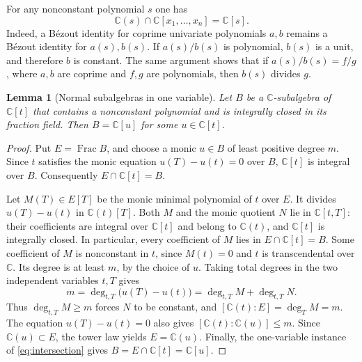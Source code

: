 \documentclass[11pt,reqno]{amsart}
\numberwithin{equation}{section}
\theoremstyle{plain}
\newtheorem{lemma}[theorem]{Lemma}
\theoremstyle{definition}
\theoremstyle{remark}
\newcommand{\C}{\mathbb C}
\newcommand{\Frac}{\operatorname{Frac}}
\begin{document}
For any nonconstant polynomial $s$ one has
\begin{equation}\label{eq:intersection}
\C(s)\cap\C[x_1,\ldots,x_n]=\C[s].
\end{equation}
Indeed, a B\'ezout identity for coprime univariate polynomials $a,b$ remains a B\'ezout identity for $a(s),b(s)$. If $a(s)/b(s)$ is polynomial, $b(s)$ is a unit, and therefore $b$ is constant. The same argument shows that if $a(s)/b(s)=f/g$, where $a,b$ are coprime
and $f,g$ are polynomials, then $b(s)$ divides $g$.

\begin{lemma}[Normal subalgebras in one variable]\label{lem:normal-subalgebra}
Let $B$ be a $\C$-subalgebra of $\C[t]$ that contains a nonconstant
polynomial and is integrally closed in its fraction field.
Then $B=\C[u]$ for some $u\in\C[t]$.
\end{lemma}
\begin{proof}
Put $E=\Frac B$, and choose a monic $u\in B$ of least positive degree
$m$. Since $t$ satisfies the monic equation $u(T)-u(t)=0$ over $B$,
$\C[t]$ is integral over $B$. Consequently
$E\cap\C[t]=B$.

Let $M(T)\in E[T]$ be the monic minimal polynomial of $t$ over $E$.
It divides $u(T)-u(t)$ in $\C(t)[T]$. Both $M$ and the monic quotient
$N$ lie in $\C[t,T]$: their coefficients are integral over $\C[t]$
and belong to $\C(t)$, and $\C[t]$ is integrally closed. In particular,
every coefficient of $M$ lies in $E\cap\C[t]=B$. Some coefficient
of $M$ is nonconstant in $t$, since $M(t)=0$ and $t$ is transcendental
over $\C$. Its degree is at least $m$, by the choice of $u$. Taking
total degrees in the two independent variables $t,T$ gives
\[
 m=\deg_{t,T}\bigl(u(T)-u(t)\bigr)
   =\deg_{t,T}M+\deg_{t,T}N.
\]
Thus $\deg_{t,T}M\ge m$ forces $N$ to be constant, and
$[\C(t):E]=\deg_T M=m$. The equation $u(T)-u(t)=0$ also gives
$[\C(t):\C(u)]\le m$. Since $\C(u)\subset E$, the tower law
yields $E=\C(u)$. Finally, the one-variable instance
of \eqref{eq:intersection} gives $B=E\cap\C[t]=\C[u]$.
\end{proof}
\end{document}
